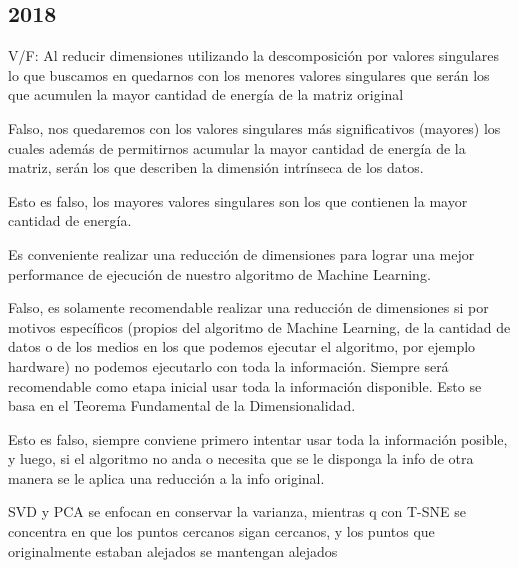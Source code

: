 \documentclass[a4paper]{article}
\newenvironment{enunciado}[3]{%
    \vspace{\baselineskip}
    \tcolorbox[beamer,%
    noparskip,breakable,
    colback=LightGreen,colframe=DarkGreen,%
    colbacklower=LimeGreen!75!LightGreen,%
    title=\small Enunciado: Año #1\, Cuatrimestre #2\, Oportunidad #3]}%
    {\endtcolorbox}
\newenvironment{criterio}[3]{%
    \tcolorbox[beamer,%
    noparskip,breakable,
    colback=LightCoral,colframe=DarkRed,%
    colbacklower=Tomato!75!LightCoral,%
    title=\small Criterio de Corrección: Año #1\, Cuatrimestre #2\, Oportunidad #3]}%
    {\endtcolorbox}
\begin{document}
    \subsection{2018}
    \begin{enunciado}{2018}{1}{1}
        V/F: Al reducir dimensiones utilizando la descomposición por valores singulares lo que buscamos en quedarnos con los menores  valores  singulares  que  serán los que acumulen la mayor cantidad de energía de la matriz original
    \end{enunciado}

    \begin{criterio}{2018}{1}{1}
	    Falso, nos quedaremos con los valores singulares más significativos (mayores) los cuales además de permitirnos acumular la mayor cantidad de energía de la matriz, serán los que describen la dimensión intrínseca de los datos.
    \end{criterio}

    Esto es falso, los mayores valores singulares son los que contienen la mayor cantidad de energía.

    \begin{enunciado}{2018}{1}{1}
	    Es  conveniente  realizar  una reducción  de  dimensiones  para  lograr una mejor performance de ejecución de nuestro    algoritmo    de   Machine Learning.
	\end{enunciado}

	\begin{criterio}{2018}{1}{1}
	    Falso, es solamente recomendable realizar una reducción de dimensiones si por motivos específicos (propios del algoritmo de Machine Learning, de la cantidad de datos o de los medios en los que podemos ejecutar el algoritmo, por ejemplo hardware) no podemos ejecutarlo con toda la información. Siempre será recomendable como etapa inicial usar toda la información disponible. Esto se basa en el Teorema Fundamental de la Dimensionalidad. 
    \end{criterio}

    Esto es falso, siempre conviene primero intentar usar toda la información posible, y luego, si el algoritmo no anda o necesita que se le disponga la info de otra manera se le aplica una reducción a la info original.

	\begin{enunciado}{2018}{1}{1}
	    SVD y PCA se enfocan en conservar la  varianza,  mientras q  con T-SNE  se concentra  en  que  los  puntos  cercanos sigan  cercanos,  y  los  puntos  que originalmente   estaban   alejados   se mantengan alejados  
	\end{enunciado}
	
\end{document}
